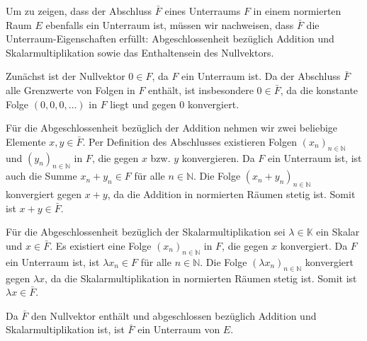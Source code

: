 Um zu zeigen, dass der Abschluss $\bar{F}$ eines Unterraums $F$ in einem normierten Raum $E$ ebenfalls ein Unterraum ist, müssen wir nachweisen, dass $\bar{F}$ die Unterraum-Eigenschaften erfüllt: Abgeschlossenheit bezüglich Addition und Skalarmultiplikation sowie das Enthaltensein des Nullvektors.

Zunächst ist der Nullvektor $0 \in F$, da $F$ ein Unterraum ist. Da der Abschluss $\bar{F}$ alle Grenzwerte von Folgen in $F$ enthält, ist insbesondere $0 \in \bar{F}$, da die konstante Folge $(0, 0, 0, \ldots)$ in $F$ liegt und gegen $0$ konvergiert.

Für die Abgeschlossenheit bezüglich der Addition nehmen wir zwei beliebige Elemente $x, y \in \bar{F}$. Per Definition des Abschlusses existieren Folgen $(x_n)_{n \in \mathbb{N}}$ und $(y_n)_{n \in \mathbb{N}}$ in $F$, die gegen $x$ bzw. $y$ konvergieren. Da $F$ ein Unterraum ist, ist auch die Summe $x_n + y_n \in F$ für alle $n \in \mathbb{N}$. Die Folge $(x_n + y_n)_{n \in \mathbb{N}}$ konvergiert gegen $x + y$, da die Addition in normierten Räumen stetig ist. Somit ist $x + y \in \bar{F}$.

Für die Abgeschlossenheit bezüglich der Skalarmultiplikation sei $\lambda \in \mathbb{K}$ ein Skalar und $x \in \bar{F}$. Es existiert eine Folge $(x_n)_{n \in \mathbb{N}}$ in $F$, die gegen $x$ konvergiert. Da $F$ ein Unterraum ist, ist $\lambda x_n \in F$ für alle $n \in \mathbb{N}$. Die Folge $(\lambda x_n)_{n \in \mathbb{N}}$ konvergiert gegen $\lambda x$, da die Skalarmultiplikation in normierten Räumen stetig ist. Somit ist $\lambda x \in \bar{F}$.

Da $\bar{F}$ den Nullvektor enthält und abgeschlossen bezüglich Addition und Skalarmultiplikation ist, ist $\bar{F}$ ein Unterraum von $E$.